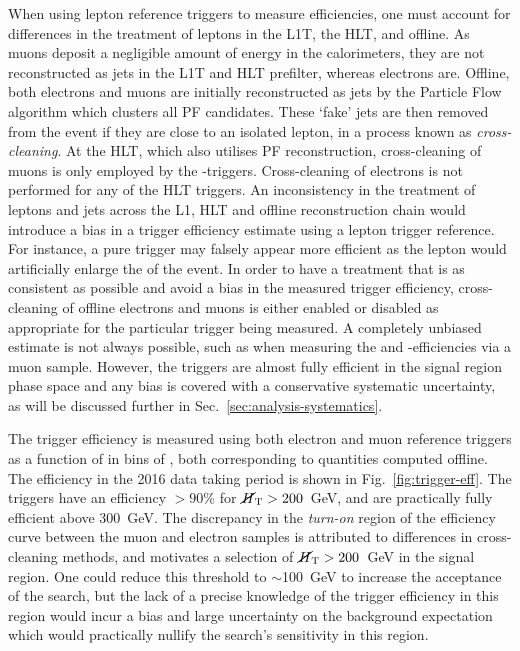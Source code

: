 When using lepton reference triggers to measure efficiencies, one must account 
for differences in the treatment of leptons in the L1T, the HLT, and offline. 
As muons deposit a negligible amount of energy in the calorimeters, they are 
not reconstructed as jets in the L1T and HLT prefilter, whereas electrons are. 
Offline, both electrons and muons are initially reconstructed as jets by the 
Particle Flow
algorithm which clusters all PF candidates. These `fake' jets are then removed 
from the event if they are close to an isolated lepton, in a process known as 
\textit{cross-cleaning}. At the HLT, which also utilises PF reconstruction, 
cross-cleaning of muons is only employed by the \met-\mht triggers.
Cross-cleaning of electrons is not performed for any of the HLT triggers.
An inconsistency in the treatment of leptons and jets across the L1, HLT and 
offline reconstruction chain would introduce a bias in a trigger efficiency 
estimate using a lepton trigger reference. For instance, a pure \scalht trigger 
may falsely appear more efficient as the lepton would artificially enlarge the 
\scalht of the event.
In order to have a treatment that is as consistent as possible and avoid a bias 
in the measured trigger efficiency, cross-cleaning of offline electrons and 
muons is either enabled or disabled as appropriate for the particular trigger 
being measured.
A completely unbiased estimate is not always possible, such as when measuring 
the \scalht and \scalht-\alphat efficiencies via a muon sample. However, the 
triggers are almost fully efficient in the signal region phase space and any 
bias is covered with a conservative systematic uncertainty, as will be 
discussed further in Sec.~\ref{sec:analysis-systematics}.

The trigger efficiency is measured using both electron and muon reference 
triggers as a function of \mht in bins of \scalht, 
both corresponding to quantities computed offline. The efficiency in the 2016 
data taking period is shown in Fig.~\ref{fig:trigger-eff}. The triggers have an 
efficiency $>90$\% for $\mbox{$\cancel{H}_\text{T}$}>200$~GeV, and are practically fully efficient 
above 300~GeV. The discrepancy in the \textit{turn-on} region of the efficiency 
curve between the muon and electron samples is attributed to differences in 
cross-cleaning methods, and motivates a selection of $\mbox{$\cancel{H}_\text{T}$}>200$~GeV in the 
signal region. One could reduce this threshold to $\sim$100~GeV to increase the 
acceptance of the search, but the lack of a precise knowledge of the trigger 
efficiency in this region would incur a bias and large uncertainty on the 
background expectation which would practically nullify the search's sensitivity 
in this region.

